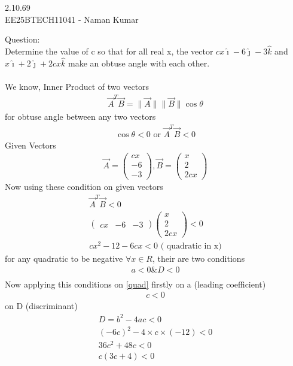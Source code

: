 \documentclass[journal]{IEEEtran}
\author{EE25BTECH11041-Naman Kumar }
\begin{document}
\begin{center}
    \huge{2.10.69}\\
    \large{EE25BTECH11041 - Naman Kumar}
\end{center}
Question:\\
Determine the value of c so that for all real x, the vector $cx\hat{\imath}-6\hat{\jmath}-3\hat{k}$ and $x\hat{\imath}+2\hat{\jmath}+2cx\hat{k}$ make an obtuse angle with each other.\\
\solution \\
We know, Inner Product of two vectors
\begin{align}
    \vec{A}^T\vec{B}=\lVert\vec{A}\rVert\lVert\vec{B}\rVert \cos{\theta}
\end{align}
for obtuse angle between any two vectors
\begin{align}
\cos{\theta}<0\text{ or } \vec{A}^T\vec{B}<0
\end{align}
Given Vectors
\begin{align}
    \vec{A}=\begin{pmatrix}cx\\-6\\-3\end{pmatrix},
    \vec{B}=\begin{pmatrix}x\\2\\2cx\end{pmatrix}
\end{align}
Now using these condition on given vectors
\begin{align}
\vec{A}^T\vec{B}<0\\
\begin{pmatrix}cx&-6&-3\end{pmatrix}\begin{pmatrix}x\\2\\2cx\end{pmatrix}<0\\
cx^2-12-6cx<0\text{ ( quadratic in x)} \label{quad}
\end{align}
for any quadratic to be negative $\forall x \in R$, their are two conditions
\begin{align}
    a<0 \&D<0\\
\end{align}
Now applying this conditions on \eqref{quad}
firstly on a (leading coefficient)
\begin{align}
    c<0 \label{1}
\end{align}
on D (discriminant)
\begin{align}
    D=b^2-4ac<0\\
    (-6c)^2-4\times c \times(-12)<0\\
    36c^2+48c<0\\
    c(3c+4)<0 \label{2}
\end{align}
\end{document}
